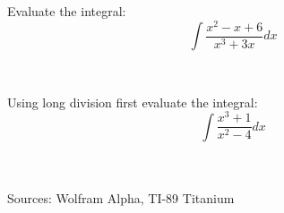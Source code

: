 \documentclass[10pt,letterpaper, cm]{hmcpset}
\begin{document}
\begin{problem}[3]
  Evaluate the integral:
  \begin{equation*}
    \int\frac{x^2 - x + 6}{x^3+3x}dx 
  \end{equation*}
\end{problem}\\

\begin{problem}[4]
  Using long division first evaluate the integral:
  \begin{equation*}
    \int\frac{x^3 + 1}{x^2-4}dx 
  \end{equation*}
\end{problem}\\
\\
Sources: Wolfram Alpha, TI-89 Titanium
\end{document}
